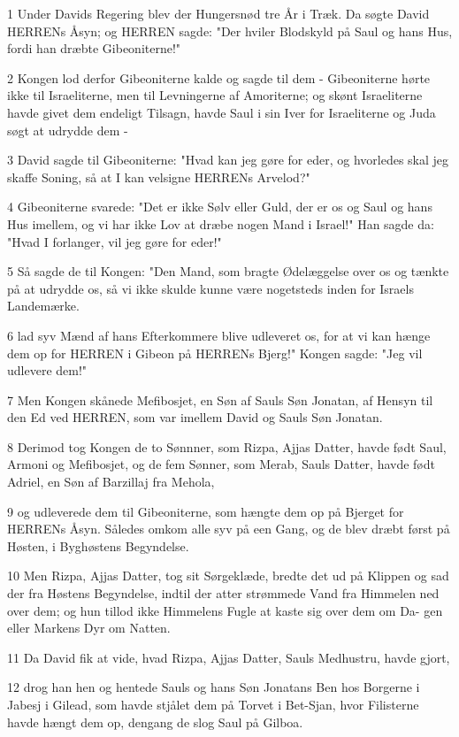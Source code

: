 \par 1 Under Davids Regering blev der Hungersnød tre År i Træk. Da søgte David HERRENs Åsyn; og HERREN sagde: "Der hviler Blodskyld på Saul og hans Hus, fordi han dræbte Gibeoniterne!"
\par 2 Kongen lod derfor Gibeoniterne kalde og sagde til dem - Gibeoniterne hørte ikke til Israeliterne, men til Levningerne af Amoriterne; og skønt Israeliterne havde givet dem endeligt Tilsagn, havde Saul i sin Iver for Israeliterne og Juda søgt at udrydde dem -
\par 3 David sagde til Gibeoniterne: "Hvad kan jeg gøre for eder, og hvorledes skal jeg skaffe Soning, så at I kan velsigne HERRENs Arvelod?"
\par 4 Gibeoniterne svarede: "Det er ikke Sølv eller Guld, der er os og Saul og hans Hus imellem, og vi har ikke Lov at dræbe nogen Mand i Israel!" Han sagde da: "Hvad I forlanger, vil jeg gøre for eder!"
\par 5 Så sagde de til Kongen: "Den Mand, som bragte Ødelæggelse over os og tænkte på at udrydde os, så vi ikke skulde kunne være nogetsteds inden for Israels Landemærke.
\par 6 lad syv Mænd af hans Efterkommere blive udleveret os, for at vi kan hænge dem op for HERREN i Gibeon på HERRENs Bjerg!" Kongen sagde: "Jeg vil udlevere dem!"
\par 7 Men Kongen skånede Mefibosjet, en Søn af Sauls Søn Jonatan, af Hensyn til den Ed ved HERREN, som var imellem David og Sauls Søn Jonatan.
\par 8 Derimod tog Kongen de to Sønnner, som Rizpa, Ajjas Datter, havde født Saul, Armoni og Mefibosjet, og de fem Sønner, som Merab, Sauls Datter, havde født Adriel, en Søn af Barzillaj fra Mehola,
\par 9 og udleverede dem til Gibeoniterne, som hængte dem op på Bjerget for HERRENs Åsyn. Således omkom alle syv på een Gang, og de blev dræbt først på Høsten, i Byghøstens Begyndelse.
\par 10 Men Rizpa, Ajjas Datter, tog sit Sørgeklæde, bredte det ud på Klippen og sad der fra Høstens Begyndelse, indtil der atter strømmede Vand fra Himmelen ned over dem; og hun tillod ikke Himmelens Fugle at kaste sig over dem om Da- gen eller Markens Dyr om Natten.
\par 11 Da David fik at vide, hvad Rizpa, Ajjas Datter, Sauls Medhustru, havde gjort,
\par 12 drog han hen og hentede Sauls og hans Søn Jonatans Ben hos Borgerne i Jabesj i Gilead, som havde stjålet dem på Torvet i Bet-Sjan, hvor Filisterne havde hængt dem op, dengang de slog Saul på Gilboa.
